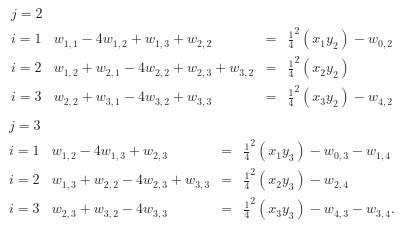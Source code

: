 \[\begin{array}{l|rcl}
j=2\\
i=1&w_{1,1}-4w_{1,2}+w_{1,3}+w_{2,2}&=&\frac{1}{4}^2(x_1y_2)-w_{0,2}\\
i=2&w_{1,2}+w_{2,1}-4w_{2,2}+w_{2,3}+w_{3,2}&=&\frac{1}{4}^2(x_2y_2)\\
i=3&w_{2,2}+w_{3,1}-4w_{3,2}+w_{3,3}&=&\frac{1}{4}^2(x_3y_2)-w_{4,2}\\
\end{array}\]	
\[\begin{array}{l|rcl}
j=3\\
i=1&w_{1,2}-4w_{1,3}+w_{2,3}&=&\frac{1}{4}^2(x_1y_3)-w_{0,3}-w_{1,4}\\
i=2&w_{1,3}+w_{2,2}-4w_{2,3}+w_{3,3}&=&\frac{1}{4}^2(x_2y_3)-w_{2,4}\\
i=3&w_{2,3}+w_{3,2}-4w_{3,3}&=&\frac{1}{4}^2(x_3y_3)-w_{4,3}-w_{3,4}.
\end{array}
\]	

